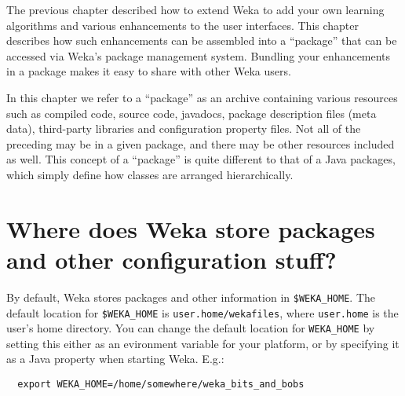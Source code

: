 %
%
%
%


The previous chapter described how to extend Weka to add your own
learning algorithms and various enhancements to the user
interfaces. This chapter describes how such enhancements can be
assembled into a ``package'' that can be accessed via Weka's package
management system. Bundling your enhancements in a package makes it
easy to share with other Weka users.

In this chapter we refer to a ``package'' as an archive containing
various resources such as compiled code, source code, javadocs,
package description files (meta data), third-party libraries and
configuration property files. Not all of the preceding may be in a
given package, and there may be other resources included as well. This
concept of a ``package'' is quite different to that of a Java packages, which
simply define how classes are arranged hierarchically.

\section{Where does Weka store packages and other configuration stuff?}

By default, Weka stores packages and other information in
\verb=$WEKA_HOME=. The default location for \verb=$WEKA_HOME= is
\verb=user.home/wekafiles=, where \verb=user.home= is the user's home
directory. You can change the default location for \verb=WEKA_HOME= by
setting this either as an evironment variable for your platform, or by
specifying it as a Java property when starting Weka. E.g.:

{\scriptsize
\begin{verbatim}
  export WEKA_HOME=/home/somewhere/weka_bits_and_bobs
\end{verbatim}}

